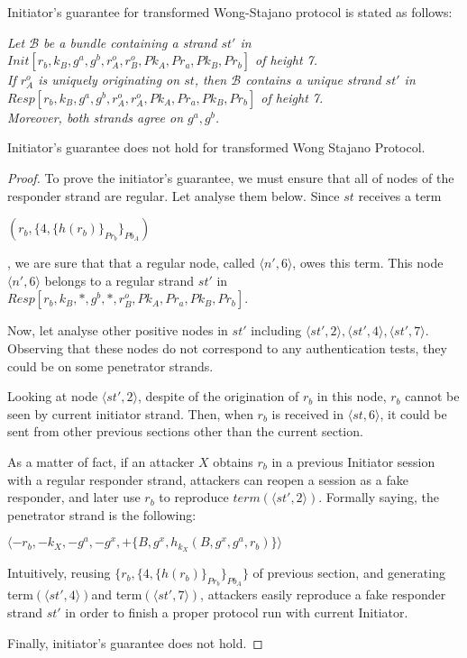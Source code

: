 Initiator's guarantee for transformed Wong-Stajano protocol is stated as follows:

\textit{Let $\mathcal{B}$ be a bundle containing a strand $st'$ in \\ {\footnotesize $Init[r_b,k_B,g^a,g^b,r^o_A,r^o_B,Pk_A,Pr_a,Pk_B,Pr_b]$} of height 7. \\ If $r^o_A$ is uniquely originating on $st$, then $\mathcal{B}$ contains a unique strand $st'$ in\\ {\footnotesize $Resp[r_b,k_B,g^a,g^b,r^o_A,r^o_A,Pk_A,Pr_a,Pk_B,Pr_b]$} of height 7. \\ Moreover, both strands agree on $g^a,g^b$.}

\begin{Proposition}
Initiator's guarantee does not hold for transformed Wong Stajano Protocol. 
\end{Proposition}

\begin{proof}
To prove the initiator's guarantee, we must ensure that all of nodes of the responder strand are regular. Let analyse them below.
Since $st$ receives a term \begin{center}$(r_b, \{4,\{h(r_b)\}_{Pr_b}\}_{Pb_A})$\end{center}, we are sure that that a regular node, called $\langle n',6\rangle $, owes this term. This node $\langle n',6\rangle $ belongs to a regular strand $st'$ in $Resp[r_b,k_B,*,g^b,*,r^o_B,Pk_A,Pr_a,Pk_B,Pr_b]$.

Now, let analyse other positive nodes in $st'$ including $\langle st',2\rangle ,\langle st',4\rangle ,\langle st',7\rangle $. Observing that these nodes do not correspond to any authentication tests, they could be on some penetrator strands. 

Looking at node $\langle st',2\rangle $, despite of the origination of $r_b$ in this node, $r_b$ cannot be seen by current initiator strand. Then, when $r_b$ is received in $\langle st,6\rangle$, it could be sent from other previous sections other than the current section. 

As a matter of fact, if an attacker $X$ obtains $r_b$ in a previous Initiator session with a regular responder strand, attackers can reopen a session as a fake responder, and later use $r_b$ to reproduce $term(\langle st',2\rangle )$. Formally saying, the penetrator strand is the following:\begin{center} $\langle-r_b,-k_X,-g^a,-g^{x}, +\{B, g^{x}, h_{k_X}(B,g^{x},g^a,r_b)\}\rangle$\end{center} 
Intuitively, reusing $\{r_b, \{4,\{h(r_b)\}_{Pr_b}\}_{Pb_A}\}$ of previous section, and generating term$(\langle st',4 \rangle)$and term$(\langle st',7 \rangle)$, attackers easily reproduce a fake responder strand $st'$ in order to finish a proper protocol run with current Initiator. 

Finally, initiator's guarantee does not hold.  

\end{proof}

